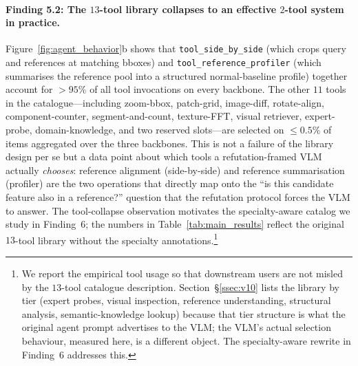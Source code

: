 \paragraph{Finding 5.2: The $13$-tool library collapses to an effective $2$-tool system in practice.}
Figure~\ref{fig:agent_behavior}b shows that \texttt{tool\_side\_by\_side} (which crops query and references at matching bboxes) and \texttt{tool\_reference\_profiler} (which summarises the reference pool into a structured normal-baseline profile) together account for $>95\%$ of all tool invocations on every backbone. The other $11$ tools in the catalogue---including zoom-bbox, patch-grid, image-diff, rotate-align, component-counter, segment-and-count, texture-FFT, visual retriever, expert-probe, domain-knowledge, and two reserved slots---are selected on $\le 0.5\%$ of items aggregated over the three backbones. This is not a failure of the library design per se but a data point about which tools a refutation-framed VLM actually \emph{chooses}: reference alignment (side-by-side) and reference summarisation (profiler) are the two operations that directly map onto the ``is this candidate feature also in a reference?'' question that the refutation protocol forces the VLM to answer. The tool-collapse observation motivates the specialty-aware catalog we study in Finding~6; the numbers in Table~\ref{tab:main_results} reflect the original $13$-tool library without the specialty annotations.\footnote{We report the empirical tool usage so that downstream users are not misled by the $13$-tool catalogue description. Section~\S\ref{ssec:v10} lists the library by tier (expert probes, visual inspection, reference understanding, structural analysis, semantic-knowledge lookup) because that tier structure is what the original agent prompt advertises to the VLM; the VLM's actual selection behaviour, measured here, is a different object. The specialty-aware rewrite in Finding~6 addresses this.}

